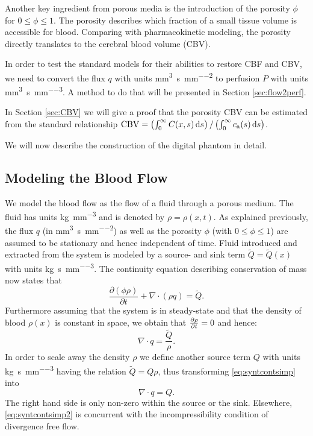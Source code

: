 \documentclass[paper=a4, fontsize=12pt,parskip=half, draft, headings=small]{scrartcl}
\newcommand{\ca}{c_\mathrm{a}}
\newcommand{\CBV}{\mathrm{CBV}}
\newcommand{\siq}{\cubic\milli\meter\per\second\per\square\milli\meter}
\newcommand{\siP}{\cubic\milli\meter\per\second\per\cubic\milli\meter}
\newcommand{\siQ}{\kilo\gram\per\second\per\cubic\milli\meter}
\newcommand{\sirho}{\kilo\gram\per\cubic\milli\meter}
\begin{document}
	Another key ingredient from porous media is the introduction of the porosity $\phi$ for $0 \le \phi \le 1$.
	The porosity describes which fraction of a small tissue volume is accessible for blood.
	Comparing with pharmacokinetic modeling, the porosity directly translates to the cerebral blood volume (CBV).
	
	In order to test the standard models for their abilities to restore CBF and CBV, we need to convert the flux $q$ with units \si{\siq} to perfusion $P$ with units \si{\siP}. 
	A method to do that will be presented in Section \ref{sec:flow2perf}.

	In Section \ref{sec:CBV} we will give a proof that the porosity CBV can be estimated from the standard relationship $\CBV = \left(\int_0^\infty C(x,s) \diffint s\right)/\left(\int_0^\infty \ca(s) \diffint s\right)$.

	We will now describe the construction of the digital phantom in detail.
	
	
	\subsection{Modeling the Blood Flow}\label{sec:flow}
	
	We model the blood flow as the flow of a fluid through a porous medium. 
	The fluid has units \si{\sirho} and is denoted by $\rho = \rho(x,t)$.
	As explained previously, the flux $q$ (in \si{\siq}) as well as the porosity $\phi$ (with $0 \le \phi \le 1$) are assumed to be stationary and hence independent of time.
	Fluid introduced and extracted from the system is modeled by a source- and sink term $\tilde{Q} = \tilde{Q}(x)$ with units \si{\siQ}. 
	The continuity equation describing conservation of mass now states that
	\begin{equation}
		\frac{\partial (\phi \rho)}{\partial t} + \nabla \cdot (\rho q) = \tilde{Q}.
		\label{eq:syntcont}
	\end{equation} 
	Furthermore assuming that the system is in steady-state and that the density of blood $\rho(x)$ is constant in space, we obtain that $\frac{\partial \rho}{\partial t} = 0$ and hence:
	\begin{equation}
		\nabla \cdot q = \frac{\tilde{Q}}{\rho}.
		\label{eq:syntcontsimp}
	\end{equation}
	In order to scale away the density $\rho$ we define another source term $Q$ with units \si{\siQ} having the relation $\tilde{Q} = Q\rho$, thus transforming \eqref{eq:syntcontsimp} into
	\begin{equation}
		\nabla \cdot q = Q.
		\label{eq:syntcontsimp2}
	\end{equation}
	The right hand side is only non-zero within the source or the sink. 
	Elsewhere, \eqref{eq:syntcontsimp2} is concurrent with the incompressibility condition of divergence free flow.
	
\end{document}
